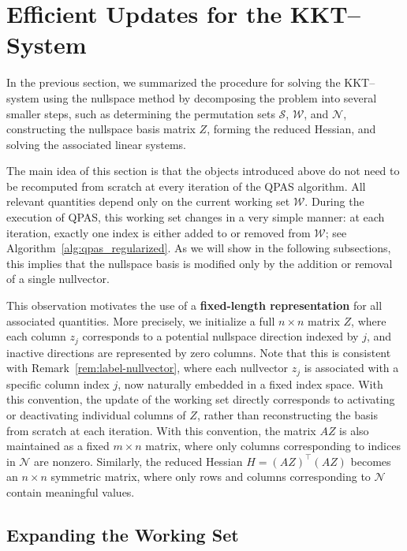\documentclass{book}
\theoremstyle{definition}
\newcounter{algorithm_}
\numberwithin{algorithm_}{chapter}
\begin{document}
{\section{Efficient Updates for the KKT--System}
\label{sec:updating_KKTsystem}

In the previous section, we summarized the procedure for solving the KKT--system using the nullspace method by decomposing the problem into several smaller steps, such as determining the permutation sets \(\mathcal{S}\), \(\mathcal{W}\), and \(\mathcal{N}\), constructing the nullspace basis matrix \(Z\), forming the reduced Hessian, and solving the associated linear systems.

\bigskip

The main idea of this section is that the objects introduced above do not need to be recomputed from scratch at every iteration of the QPAS algorithm. All relevant quantities depend only on the current working set $\mathcal{W}$. During the execution of QPAS, this working set changes in a very simple manner: at each iteration, exactly one index is either added to or removed from $\mathcal{W}$; see Algorithm~\ref{alg:qpas_regularized}. As we will show in the following subsections, this implies that the nullspace basis is modified only by the addition or removal of a single nullvector.

\medskip

This observation motivates the use of a \textbf{fixed-length representation} for all associated quantities. More precisely, we initialize a full $n \times n$ matrix $Z$, where each column $z_j$ corresponds to a potential nullspace direction indexed by $j$, and inactive directions are represented by zero columns. Note that this is consistent with Remark~\ref{rem:label-nullvector}, where each nullvector \(z_j\) is associated with a specific column index \(j\), now naturally embedded in a fixed index space. With this convention, the update of the working set directly corresponds to activating or deactivating individual columns of $Z$, rather than reconstructing the basis from scratch at each iteration.
With this convention, the matrix $AZ$ is also maintained as a fixed $m \times n$ matrix, where only columns corresponding to indices in $\mathcal{N}$ are nonzero. Similarly, the reduced Hessian $H = (AZ)^\top (AZ)$ becomes an $n \times n$ symmetric matrix, where only rows and columns corresponding to $\mathcal{N}$ contain meaningful values.



\subsection{Expanding the Working Set}
\label{subsec:expanding_workingset}

}
\end{document}
